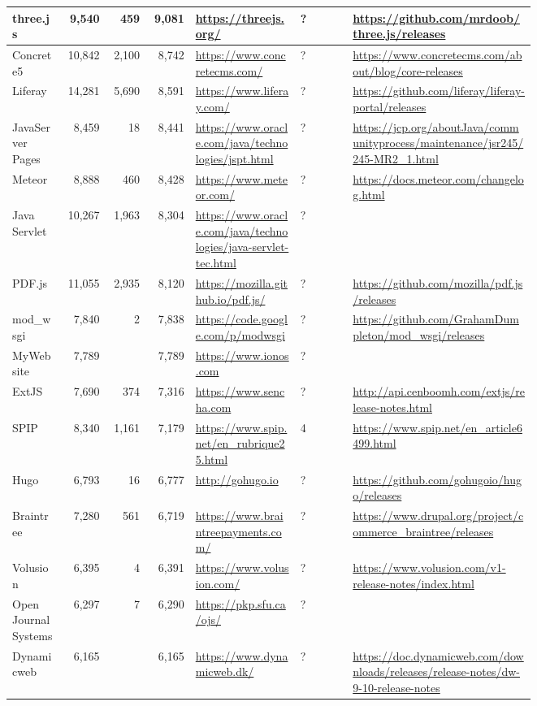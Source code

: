\begin{landscape}
\begin{longtable}{|p{0.1\linewidth}|r|r|r|p{0.2\linewidth}|p{0.1\linewidth}|p{0.35\linewidth}|}
		three.js &9,540 &459 &9,081 &\url{https://threejs.org/} &? &\url{https://github.com/mrdoob/three.js/releases} \\\hline
		Concrete5 &10,842 &2,100 &8,742 &\url{https://www.concretecms.com/} &? &\url{https://www.concretecms.com/about/blog/core-releases} \\\hline
		Liferay &14,281 &5,690 &8,591 &\url{https://www.liferay.com/} &? &\url{https://github.com/liferay/liferay-portal/releases} \\\hline
		JavaServer Pages &8,459 &18 &8,441 &\url{https://www.oracle.com/java/technologies/jspt.html} &? &\url{https://jcp.org/aboutJava/communityprocess/maintenance/jsr245/245-MR2\_1.html} \\\hline
		Meteor &8,888 &460 &8,428 &\url{https://www.meteor.com/} &? &\url{https://docs.meteor.com/changelog.html} \\\hline
		Java Servlet &10,267 &1,963 &8,304 &\url{https://www.oracle.com/java/technologies/java-servlet-tec.html} &? & \\\hline
		PDF.js &11,055 &2,935 &8,120 &\url{https://mozilla.github.io/pdf.js/} &? &\url{https://github.com/mozilla/pdf.js/releases} \\\hline
		mod\_wsgi &7,840 &2 &7,838 &\url{https://code.google.com/p/modwsgi} &? &\url{https://github.com/GrahamDumpleton/mod\_wsgi/releases} \\\hline
		MyWebsite &7,789 & &7,789 &\url{https://www.ionos.com} &? & \\\hline
		ExtJS &7,690 &374 &7,316 &\url{https://www.sencha.com} &? &\url{http://api.cenboomh.com/extjs/release-notes.html} \\\hline
		SPIP &8,340 &1,161 &7,179 &\url{https://www.spip.net/en\_rubrique25.html} &4 &\url{https://www.spip.net/en\_article6499.html} \\\hline
		Hugo &6,793 &16 &6,777 &\url{http://gohugo.io} &? &\url{https://github.com/gohugoio/hugo/releases} \\\hline
		Braintree &7,280 &561 &6,719 &\url{https://www.braintreepayments.com/} &? &\url{https://www.drupal.org/project/commerce\_braintree/releases} \\\hline
		Volusion &6,395 &4 &6,391 &\url{https://www.volusion.com/} &? &\url{https://www.volusion.com/v1-release-notes/index.html} \\\hline
		Open Journal Systems &6,297 &7 &6,290 &\url{https://pkp.sfu.ca/ojs/} &? & \\\hline
		Dynamicweb &6,165 & &6,165 &\url{https://www.dynamicweb.dk/} &? &\url{https://doc.dynamicweb.com/downloads/releases/release-notes/dw-9-10-release-notes} \\\hline

\end{longtable}
\end{landscape}

